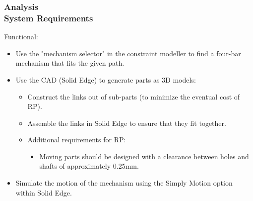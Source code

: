 \documentclass[ucs,10pt]{beamer}
\begin{document}
\begin{frame}
\frametitle{Analysis \\
    \small \color{rwth-blue} System Requirements}
    Functional:
    \begin{itemize}
        \item Use the "mechanism selector" in the constraint modeller to find a four-bar mechanism that fits the given path.
        \item Use the CAD (Solid Edge) to generate parts as 3D models:
        \begin{itemize}
            \item Construct the links out of sub-parts (to minimize the eventual cost of RP).
            \item Assemble the links in Solid Edge to ensure that they fit together.
            \item Additional requirements for RP:
            \begin{itemize}
                \item Moving parts should be designed with a clearance between holes and shafts of approximately 0.25mm.
            \end{itemize}
        \end{itemize}
        \item Simulate the motion of the mechanism using the Simply Motion option within Solid Edge.
    \end{itemize}
\end{frame}
\end{document}
